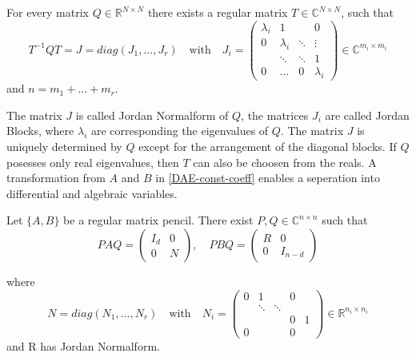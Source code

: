 \begin{theorem}
	For every matrix $Q \in \mathbb{R}^{N \times N}$ there exists a regular matrix $T \in \mathbb{C}^{N \times N}$, such that
	\begin{displaymath}
		T^{-1}QT = J = diag(J_1, ..., J_r) \quad \text{with} \quad J_i = 
		\left(
		\begin{matrix}
			\lambda_i & 1 & & 0 \\
			0 & \lambda_i & \ddots & \vdots \\
			& \ddots & \ddots & 1 \\
			0 & \hdots & 0 & \lambda_i
		\end{matrix}
		\right)
		\in \mathbb{C}^{m_i \times m_i}
	\end{displaymath} 
	and $n = m_1 + ... + m_r$.
\end{theorem}

The matrix $J$ is called Jordan Normalform of $Q$, the matrices $J_i$ are called Jordan Blocks, where $\lambda_i$ are corresponding the eigenvalues of $Q$. The matrix $J$ is uniquely determined by $Q$ except for the arrangement of the diagonal blocks. If $Q$ posesses only real eigenvalues, then $T$ can also be choosen from the reals. \newline
A transformation from $A$ and $B$ in \ref{DAE-const-coeff} enables a seperation into differential and algebraic variables.	
\begin{theorem}
	\label{Kronecker-Normalform}
	Let $\{ A,B \}$ be a regular matrix pencil. There exist $P,Q \in \mathbb{C}^{n \times n}$ such that
	\begin{displaymath}
		PAQ = 
		\left(
		\begin{matrix}
			I_d & 0 \\
			0 & N 
		\end{matrix}
		\right), \quad
		PBQ = 
		\left(
		\begin{matrix}
			R & 0 \\
			0 & I_{n-d}
		\end{matrix}
		\right)
	\end{displaymath}

	where
	\begin{displaymath}
		N = diag(N_1, ..., N_r) \quad \text{with} \quad N_i = 
		\left(
		\begin{matrix}
			0 & 1 & & 0\\
			& \ddots &\ddots & \\
			& & & 0 & 1 \\
			0 & & & 0
		\end{matrix}
		\right)
		\in \mathbb{R}^{n_i \times n_i}
	\end{displaymath}
	and R has Jordan Normalform.
\end{theorem}

